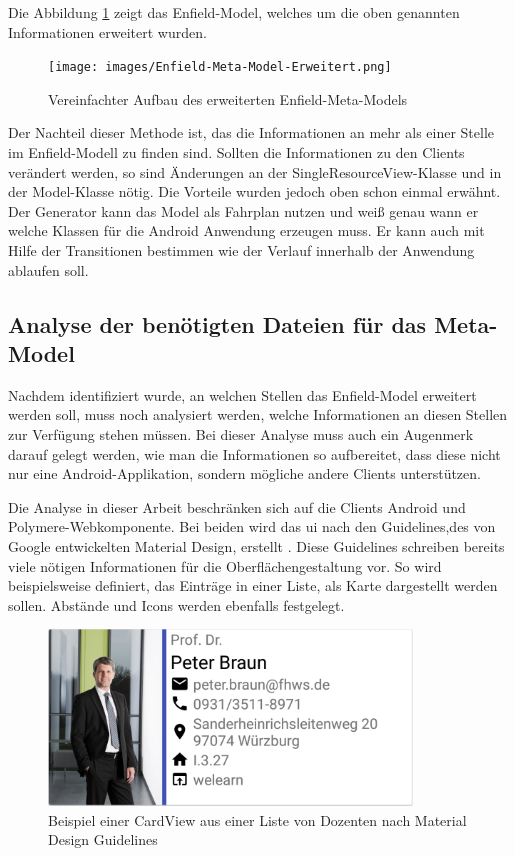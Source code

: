 Die Abbildung \ref{fig:enfield-model-extended} zeigt das Enfield-Model, welches um die oben genannten Informationen erweitert wurden.

\begin{figure}[H]
	\begin{center}
		\texttt{[image: images/Enfield-Meta-Model-Erweitert.png]}
		\caption{Vereinfachter Aufbau des erweiterten Enfield-Meta-Models}
		\label{fig:enfield-model-extended}
	\end{center}
\end{figure}

Der Nachteil dieser Methode ist, das die Informationen an mehr als einer Stelle im Enfield-Modell zu finden sind. Sollten die Informationen zu den Clients verändert werden, so sind Änderungen an der SingleResourceView-Klasse und in der Model-Klasse nötig. Die Vorteile wurden jedoch oben schon einmal erwähnt. Der Generator kann das Model als Fahrplan nutzen und weiß genau wann er welche Klassen für die Android Anwendung erzeugen muss. Er kann auch mit Hilfe der Transitionen bestimmen wie der Verlauf innerhalb der Anwendung ablaufen soll.

\subsection{Analyse der benötigten Dateien für das Meta-Model}

Nachdem identifiziert wurde, an welchen Stellen das Enfield-Model erweitert werden soll, muss noch analysiert werden, welche Informationen an diesen Stellen zur Verfügung stehen müssen. Bei dieser Analyse muss auch ein Augenmerk darauf gelegt werden, wie man die Informationen so aufbereitet, dass diese nicht nur eine Android-Applikation, sondern mögliche andere Clients unterstützen.

Die Analyse in dieser Arbeit beschränken sich auf die Clients Android und Polymere-Webkomponente. Bei beiden wird das \acf{ui} nach den Guidelines,des von Google entwickelten Material Design, erstellt \cite{material}. Diese Guidelines schreiben bereits viele nötigen Informationen für die Oberflächengestaltung vor. So wird beispielsweise definiert, das Einträge in einer Liste, als Karte dargestellt werden sollen. Abstände und Icons werden ebenfalls festgelegt.

\begin{figure}[H]
	\begin{center}
		\includegraphics[width=0.86\textwidth]{images/card.png}
		\caption{Beispiel einer CardView aus einer Liste von Dozenten nach Material Design Guidelines}
		\label{fig:card}
	\end{center}
\end{figure}


